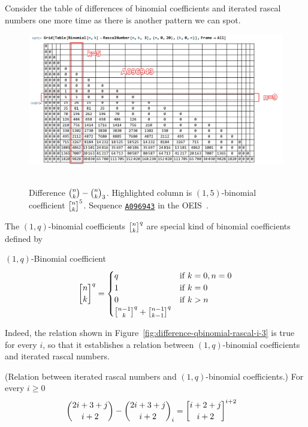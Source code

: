 ﻿Consider the table of differences of binomial coefficients and iterated rascal numbers one more time
as there is another pattern we can spot.
\begin{figure}[H]
    \centering
    \includegraphics[width=1\textwidth]{img/03_Difference_Binomial_Rascal_i_3_OneQBinomialCoefficients}
    ~\caption{Difference $\binom{n}{k}-\binom{n}{k}_{3}$.
    Highlighted column is $(1,5)$-binomial coefficient $\oneQBinomial{n}{k}{5}$.
    Sequence \href{https://oeis.org/A096943}{\texttt{A096943}} in the OEIS~\cite{sloane2004sixth}.}
    \label{fig:difference-qbinomial-rascal-i-3}
\end{figure}
The $(1,q)$-binomial coefficients $\oneQBinomial{n}{k}{q}$ are special kind of binomial coefficients defined by
\begin{definition}
    $(1,q)$-Binomial coefficient
    \begin{equation}
        \oneQBinomial{n}{k}{q} =
        \begin{cases}
            q & \mathrm{if} \; k=0, n=0 \\
            1 & \mathrm{if} \; k=0 \\
            0 & \mathrm{if} \; k > n \\
            \oneQBinomial{n-1}{k}{q} + \oneQBinomial{n-1}{k-1}{q}
        \end{cases}\label{eq:qbinomial-definition}
    \end{equation}
\end{definition}
Indeed, the relation shown in Figure~\eqref{fig:difference-qbinomial-rascal-i-3} is true for every $i$,
so that it establishes a relation between $(1,q)$-binomial coefficients and iterated rascal numbers.
\begin{proposition} (Relation between iterated rascal numbers and $(1,q)$-binomial coefficients.)
    For every $i\geq0$
    \label{prop:row-column-difference-qbinomial}
    \begin{align*}
        \binom{2i+3+j}{i+2} - \rascalNumber{2i+3+j}{i+2}{i} &= \oneQBinomial{i+2+j}{i+2}{i+2}
    \end{align*}
\end{proposition}
